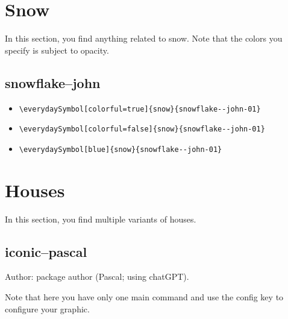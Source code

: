 \documentclass{article}
\begin{document}
\section{Snow}

In this section, you find anything related to snow. Note that the colors you specify is subject to opacity.

\subsection{snowflake--john}
\begin{itemize}
  \item \verb|\everydaySymbol[colorful=true]{snow}{snowflake--john-01}| \dotfill\ 
  \item \verb|\everydaySymbol[colorful=false]{snow}{snowflake--john-01}| \dotfill\ 
  \item \verb|\everydaySymbol[blue]{snow}{snowflake--john-01}| \dotfill\ 
\end{itemize}




\section{Houses}

In this section, you find multiple variants of houses.

\subsection{iconic--pascal}

Author: package author (Pascal; using chatGPT). 

Note that here you have only one main command and use the config key to configure your graphic.
\end{document}
